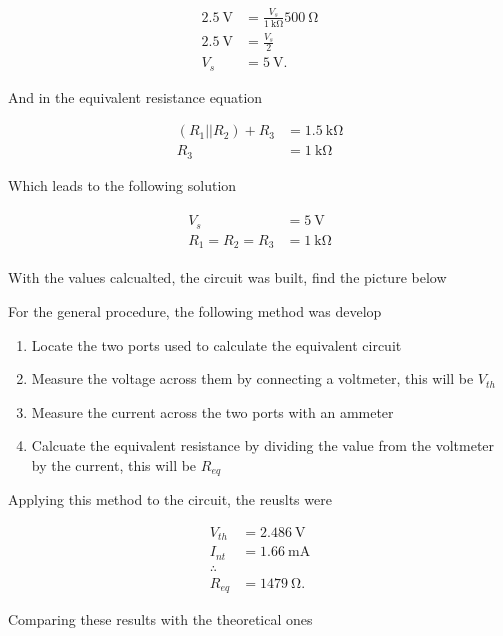 \documentclass[english,12pt]{article}
\begin{document}
\begin{align*}
    \SI{2.5}{\volt} &= \frac{V_s}{\SI{1}{\kilo\ohm}} \SI{500}{\ohm}\\
    \SI{2.5}{\volt} &= \frac{V_s}{2}\\
    V_s &= \SI{5}{\volt}.
\end{align*}

And in the equivalent resistance equation

\begin{align*}
    (R_1||R_2) + R_3 &= \SI{1.5}{\kilo\ohm}\\
    R_3 &= \SI{1}{\kilo\ohm}
\end{align*}

Which leads to the following solution

\begin{align*}
\boxed{
\begin{array}{rcl}
V_s &= \SI{5}{\volt} \\
R_1 = R_2 = R_3 &= \SI{1}{\kilo\ohm}
\end{array}
}
\end{align*}

With the values calcualted, the circuit was built, find the picture below 


For the general procedure, the following method was develop

\begin{enumerate}
    \item Locate the two ports used to calculate the equivalent circuit
    \item Measure the voltage across them by connecting a voltmeter, this will be $V_{th}$
    \item Measure the current across the two ports with an ammeter
    \item Calcuate the equivalent resistance by dividing the value from the voltmeter by the current, this will be $R_{eq}$
\end{enumerate}

Applying this method to the circuit, the reuslts were

\begin{align*}
    V_{th} &= \SI{2.486}{\volt}\\
    I_{nt} &= \SI{1.66}{\milli\ampere}\\
    \therefore\\
    R_{eq} &= \SI{1479}{\ohm}.
\end{align*}

Comparing these results with the theoretical ones
\end{document}
